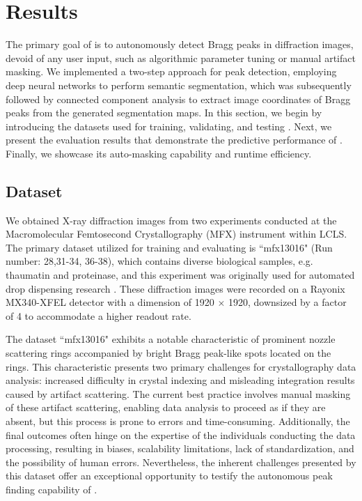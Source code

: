 \documentclass[a4paper]{article}
\begin{document}
\section{Results}

The primary goal of \peaknet{} is to autonomously detect Bragg peaks in
diffraction images, devoid of any user input, such as algorithmic parameter
tuning or manual artifact masking.  We implemented a two-step approach for peak
detection, employing deep neural networks to perform semantic segmentation,
which was subsequently followed by connected component analysis to extract image
coordinates of Bragg peaks from the generated segmentation maps.  In this
section, we begin by introducing the datasets used for training, validating, and
testing \peaknet{}. Next, we present the evaluation results that demonstrate the
predictive performance of \peaknet{}. Finally, we showcase its auto-masking
capability and runtime efficiency.


\subsection{Dataset}

We obtained X-ray diffraction images from two experiments conducted at the
Macromolecular Femtosecond Crystallography (MFX) instrument within LCLS.  The
primary dataset utilized for training and evaluating \peaknet{} is ``mfx13016"
(Run number: 28,31-34, 36-38), which contains diverse biological samples, e.g.
thaumatin and proteinase, and this experiment was originally used for automated
drop dispensing research \citep{suSerialCrystallographyUsing2021}.  These
diffraction images were recorded on a Rayonix MX340-XFEL detector with a
dimension of 1920 $\times$ 1920, downsized by a factor of 4 to accommodate a
higher readout rate.  

The dataset ``mfx13016" exhibits a notable characteristic of prominent nozzle
scattering rings accompanied by bright Bragg peak-like spots located on the
rings.  This characteristic presents two primary challenges for crystallography
data analysis: increased difficulty in crystal indexing and misleading
integration results caused by artifact scattering.  The current best practice
involves manual masking of these artifact scattering, enabling data analysis to
proceed as if they are absent, but this process is prone to errors and
time-consuming.  Additionally, the final outcomes often hinge on the expertise
of the individuals conducting the data processing, resulting in biases,
scalability limitations, lack of standardization, and the possibility of human
errors.  Nevertheless, the inherent challenges presented by this dataset offer
an exceptional opportunity to testify the autonomous peak finding capability of
\peaknet{}.
\end{document}
